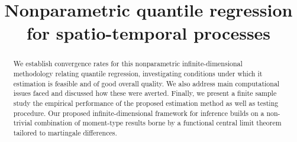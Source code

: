 \documentclass[aos]{imsart}
\theoremstyle{plain}
\theoremstyle{remark}
\newcommand{\cnam}[1]{\textcolor{mypurple}{#1}}
\begin{document}
\begin{frontmatter}
\title{Nonparametric quantile regression for spatio-temporal processes}


\address[C]{Applied Statistics Division, Indian Statistical Institute Kolkata}



\begin{abstract}
%
We establish convergence rates for this nonparametric infinite-dimensional methodology relating quantile regression, investigating conditions under which it estimation is feasible and of good overall quality. We also address main computational issues faced and discussed how these were averted. Finally, we present a finite sample study the empirical performance of the proposed estimation method as well as testing procedure. \cnam{Our proposed infinite-dimensional framework for inference builds on a non-trivial combination of moment-type results borne by a functional central limit theorem tailored to martingale differences.}
%
\end{abstract}

\begin{keyword}[class=MSC]
\end{keyword}

\begin{keyword}
\end{keyword}

\end{frontmatter}
\end{document}

